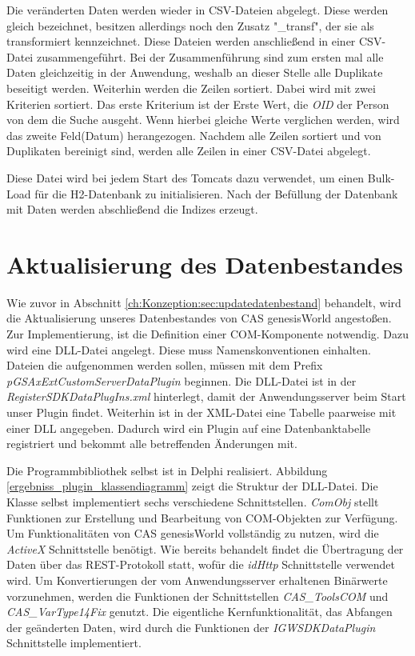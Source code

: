 Die veränderten Daten werden wieder in CSV-Dateien abgelegt. Diese werden gleich bezeichnet, besitzen allerdings noch den Zusatz "\_transf", der sie als transformiert kennzeichnet. Diese Dateien werden anschließend in einer CSV-Datei zusammengeführt. Bei der Zusammenführung sind zum ersten mal alle Daten gleichzeitig in der Anwendung, weshalb an dieser Stelle alle Duplikate beseitigt werden. Weiterhin werden die Zeilen sortiert. Dabei wird mit zwei Kriterien sortiert. Das erste Kriterium ist der Erste Wert, die \textit{OID} der Person von dem die Suche ausgeht. Wenn hierbei gleiche Werte verglichen werden, wird das zweite Feld(Datum) herangezogen. Nachdem alle Zeilen sortiert und von Duplikaten bereinigt sind, werden alle Zeilen in einer CSV-Datei abgelegt. 

Diese Datei wird bei jedem Start des Tomcats dazu verwendet, um einen Bulk-Load für die H2-Datenbank zu initialisieren. Nach der Befüllung der Datenbank mit Daten werden abschließend die Indizes erzeugt.


\section{Aktualisierung des Datenbestandes}

Wie zuvor in Abschnitt \ref{ch:Konzeption:sec:updatedatenbestand} behandelt, wird die Aktualisierung unseres Datenbestandes von CAS genesisWorld angestoßen. Zur Implementierung, ist die Definition einer COM-Komponente notwendig. Dazu wird eine DLL-Datei angelegt. Diese muss Namenskonventionen einhalten. Dateien die aufgenommen werden sollen, müssen mit dem Prefix \textit{pGSAxExtCustomServerDataPlugin} beginnen. Die DLL-Datei ist in der \textit{RegisterSDKDataPlugIns.xml} hinterlegt, damit der Anwendungsserver beim Start unser Plugin findet. Weiterhin ist in der XML-Datei eine Tabelle paarweise mit einer DLL angegeben. Dadurch wird ein Plugin auf eine Datenbanktabelle registriert und bekommt alle betreffenden Änderungen mit.

Die Programmbibliothek selbst ist in Delphi realisiert. Abbildung \ref{ergebniss_plugin_klassendiagramm} zeigt die Struktur der DLL-Datei. Die Klasse selbst implementiert sechs verschiedene Schnittstellen. \textit{ComObj} stellt Funktionen zur Erstellung und Bearbeitung von COM-Objekten zur Verfügung. Um Funktionalitäten von CAS genesisWorld vollständig zu nutzen, wird die \textit{ActiveX} Schnittstelle benötigt. Wie bereits behandelt findet die Übertragung der Daten über das REST-Protokoll statt, wofür die \textit{idHttp} Schnittstelle verwendet wird. Um Konvertierungen der vom Anwendungsserver erhaltenen Binärwerte vorzunehmen, werden die Funktionen der Schnittstellen \textit{CAS\_ToolsCOM} und \textit{CAS\_VarType14Fix} genutzt. Die eigentliche Kernfunktionalität, das Abfangen der geänderten Daten, wird durch die Funktionen der \textit{IGWSDKDataPlugin} Schnittstelle implementiert.


